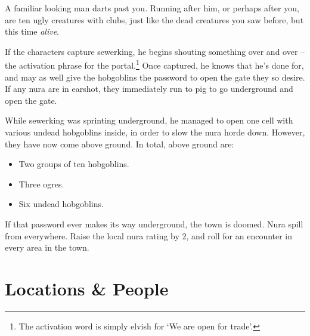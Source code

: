 \begin{multicols}{2}
\begin{speechtext}
	A familiar looking man darts past you.
	Running after him, or perhaps after you, are ten ugly creatures with clubs, just like the dead creatures you saw before, but this time \emph{alive}.

\end{speechtext}


\deephobgoblin

If the characters capture \gls{sewerking}, he begins shouting something over and over -- the activation phrase for the portal.\footnote{The activation word is simply elvish for `We are open for trade'.}  Once captured, he knows that he's done for, and may as well give the hobgoblins the password to open the gate they so desire.  If any nura are in earshot, they immediately run to \gls{pig} to go underground and open the gate.

While \gls{sewerking} was sprinting underground, he managed to open one cell with various undead hobgoblins inside, in order to slow the nura horde down.  However, they have now come above ground.  In total, above ground are:

\begin{itemize}

	\item{Two groups of ten hobgoblins.}
	\item{Three ogres.}
	\item{Six undead hobgoblins.}

\end{itemize}


\undeadhobgoblin

If that password ever makes its way underground, the town is doomed.
Nura spill from everywhere.
Raise the local nura rating by 2, and roll for an encounter in every area in the town.

\end{multicols}

\stopcontents[town]
\stopcontents[sq]

\section{Locations \& People}

